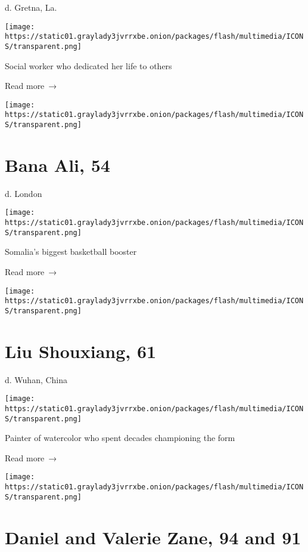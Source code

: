 d. Gretna, La.

\texttt{[image: https://static01.graylady3jvrrxbe.onion/packages/flash/multimedia/ICONS/transparent.png]}

Social worker who dedicated her life to others

 Read more~→

\href{https://www.nytimes3xbfgragh.onion/2020/05/05/obituaries/bana-ali-dead-coronavirus.html}{}

\texttt{[image: https://static01.graylady3jvrrxbe.onion/packages/flash/multimedia/ICONS/transparent.png]}

\hypertarget{bana-ali-54}{%
\section{Bana Ali, 54}\label{bana-ali-54}}

d. London

\texttt{[image: https://static01.graylady3jvrrxbe.onion/packages/flash/multimedia/ICONS/transparent.png]}

Somalia's biggest basketball booster

 Read more~→

\href{https://www.nytimes3xbfgragh.onion/2020/05/04/obituaries/liu-shouxiang-coronavirus-dead.html}{}

\texttt{[image: https://static01.graylady3jvrrxbe.onion/packages/flash/multimedia/ICONS/transparent.png]}

\hypertarget{liu-shouxiang-61}{%
\section{Liu Shouxiang, 61}\label{liu-shouxiang-61}}

d. Wuhan, China

\texttt{[image: https://static01.graylady3jvrrxbe.onion/packages/flash/multimedia/ICONS/transparent.png]}

Painter of watercolor who spent decades championing the form

 Read more~→

\href{https://www.nytimes3xbfgragh.onion/2020/05/04/obituaries/daniel-and-valerie-zane-dead-coronavirus.html}{}

\texttt{[image: https://static01.graylady3jvrrxbe.onion/packages/flash/multimedia/ICONS/transparent.png]}

\hypertarget{daniel-and-valerie-zane-94-and-91}{%
\section{Daniel and Valerie Zane, 94 and
91}\label{daniel-and-valerie-zane-94-and-91}}

